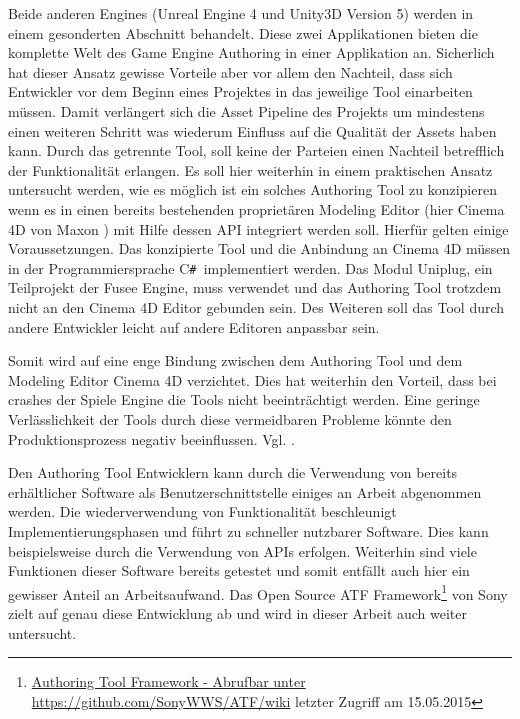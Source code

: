 \documentclass[pagesize, paper=a4, fontsize=12pt, titlepage=true, headings=small, headnosepline, abstractoff, liststotoc, nochapterprefix, plainheadsepline, twoside]{scrreprt}
\newcommand{\CSS}{C\texttt{\# }}
\begin{document}
Beide anderen Engines (Unreal Engine 4 und Unity3D Version 5) werden in einem gesonderten Abschnitt behandelt. Diese zwei Applikationen bieten die komplette Welt des Game Engine Authoring in einer Applikation an. Sicherlich hat dieser Ansatz gewisse Vorteile aber vor allem den Nachteil, dass sich Entwickler vor dem Beginn eines Projektes in das jeweilige Tool einarbeiten müssen. Damit verlängert sich die Asset Pipeline des Projekts um mindestens einen weiteren Schritt was wiederum Einfluss auf die Qualität der Assets haben kann. Durch das getrennte Tool, soll keine der Parteien einen Nachteil betrefflich der Funktionalität erlangen.
Es soll hier weiterhin in einem praktischen Ansatz untersucht werden, wie es möglich ist ein solches Authoring Tool zu konzipieren wenn es in einen bereits bestehenden proprietären Modeling Editor (hier Cinema 4D von Maxon ) mit Hilfe dessen API integriert werden soll. Hierfür gelten einige Voraussetzungen. Das konzipierte Tool und die Anbindung an Cinema 4D müssen in der Programmiersprache \CSS implementiert werden. Das Modul Uniplug, ein Teilprojekt der Fusee Engine, muss verwendet und das Authoring Tool trotzdem nicht an den Cinema 4D Editor gebunden sein. Des Weiteren soll das Tool durch andere Entwickler leicht auf andere Editoren anpassbar sein.

Somit wird auf eine enge Bindung zwischen dem Authoring Tool und dem Modeling Editor Cinema 4D verzichtet. Dies hat weiterhin den Vorteil, dass bei crashes der Spiele Engine die Tools nicht beeinträchtigt werden. Eine geringe Verlässlichkeit der Tools durch diese vermeidbaren Probleme könnte den Produktionsprozess negativ beeinflussen. Vgl. .

Den Authoring Tool Entwicklern kann durch die Verwendung von bereits erhältlicher Software als Benutzerschnittstelle einiges an Arbeit abgenommen werden. Die wiederverwendung von Funktionalität beschleunigt Implementierungsphasen und führt zu schneller nutzbarer Software. Dies kann beispielsweise durch die Verwendung von APIs erfolgen. Weiterhin sind viele Funktionen dieser Software bereits getestet und somit entfällt auch hier ein gewisser Anteil an Arbeitsaufwand. Das Open Source ATF Framework\footnote{\url{Authoring Tool Framework - Abrufbar unter https://github.com/SonyWWS/ATF/wiki} letzter Zugriff am 15.05.2015} von Sony zielt auf genau diese Entwicklung ab und wird in dieser Arbeit auch weiter untersucht.
\end{document}
